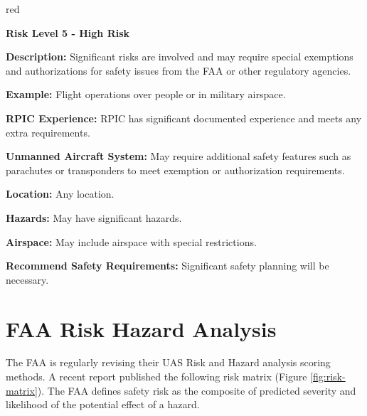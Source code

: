 \documentclass[
]{book}
\newenvironment{content}{\hrulefill}{}{}
\newenvironment{titleB}{}{}
\begin{document}
\begin{content-box}{red}

\begin{titleB}

\textbf{Risk Level 5 - High Risk}

\end{titleB}

\begin{content}

\textbf{Description:} Significant risks are involved and may require special exemptions and authorizations for safety issues from the FAA or other regulatory agencies.

\textbf{Example:} Flight operations over people or in military airspace.

\textbf{RPIC Experience:} RPIC has significant documented experience and meets any extra requirements.

\textbf{Unmanned Aircraft System:} May require additional safety features such as parachutes or transponders to meet exemption or authorization requirements.

\textbf{Location:} Any location.

\textbf{Hazards:} May have significant hazards.

\textbf{Airspace:} May include airspace with special restrictions.

\textbf{Recommend Safety Requirements:} Significant safety planning will be necessary.

\end{content}

\end{content-box}

\hypertarget{ch-risk-analysis}{%
\chapter{FAA Risk Hazard Analysis}\label{ch-risk-analysis}}

The FAA is regularly revising their UAS Risk and Hazard analysis scoring methods. A recent report published the following risk matrix (Figure \ref{fig:risk-matrix}). The FAA defines safety risk as the composite of predicted severity and likelihood of the potential effect of a hazard.
\end{document}
